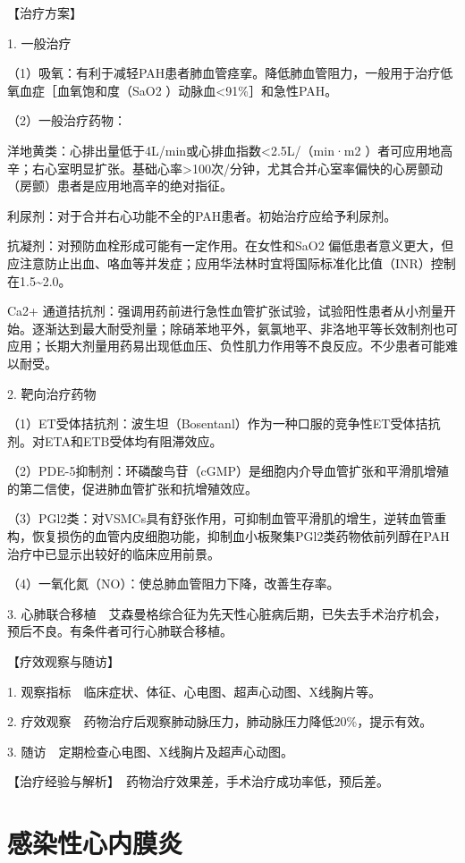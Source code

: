 【治疗方案】

1. 一般治疗

（1）吸氧：有利于减轻PAH患者肺血管痉挛。降低肺血管阻力，一般用于治疗低氧血症［血氧饱和度（SaO{2}
）动脉血\textless{}91\%］和急性PAH。

（2）一般治疗药物：

洋地黄类：心排出量低于4L/min或心排血指数\textless{}2.5L/（min·m{2}
）者可应用地高辛；右心室明显扩张。基础心率\textgreater{}100次/分钟，尤其合并心室率偏快的心房颤动（房颤）患者是应用地高辛的绝对指征。

利尿剂：对于合并右心功能不全的PAH患者。初始治疗应给予利尿剂。

抗凝剂：对预防血栓形成可能有一定作用。在女性和SaO{2}
偏低患者意义更大，但应注意防止出血、咯血等并发症；应用华法林时宜将国际标准化比值（INR）控制在1.5\textasciitilde{}2.0。

Ca{2+}
通道拮抗剂：强调用药前进行急性血管扩张试验，试验阳性患者从小剂量开始。逐渐达到最大耐受剂量；除硝苯地平外，氨氯地平、非洛地平等长效制剂也可应用；长期大剂量用药易出现低血压、负性肌力作用等不良反应。不少患者可能难以耐受。

2. 靶向治疗药物

（1）ET受体拮抗剂：波生坦（Bosentanl）作为一种口服的竞争性ET受体拮抗剂。对ETA和ETB受体均有阻滞效应。

（2）PDE-5抑制剂：环磷酸鸟苷（cGMP）是细胞内介导血管扩张和平滑肌增殖的第二信使，促进肺血管扩张和抗增殖效应。

（3）PGl2类：对VSMCs具有舒张作用，可抑制血管平滑肌的增生，逆转血管重构，恢复损伤的血管内皮细胞功能，抑制血小板聚集PGl2类药物依前列醇在PAH治疗中已显示出较好的临床应用前景。

（4）一氧化氮（NO）：使总肺血管阻力下降，改善生存率。

3.
心肺联合移植　艾森曼格综合征为先天性心脏病后期，已失去手术治疗机会，预后不良。有条件者可行心肺联合移植。

【疗效观察与随访】

1. 观察指标　临床症状、体征、心电图、超声心动图、X线胸片等。

2. 疗效观察　药物治疗后观察肺动脉压力，肺动脉压力降低20\%，提示有效。

3. 随访　定期检查心电图、X线胸片及超声心动图。

【治疗经验与解析】　药物治疗效果差，手术治疗成功率低，预后差。


\section{感染性心内膜炎}

